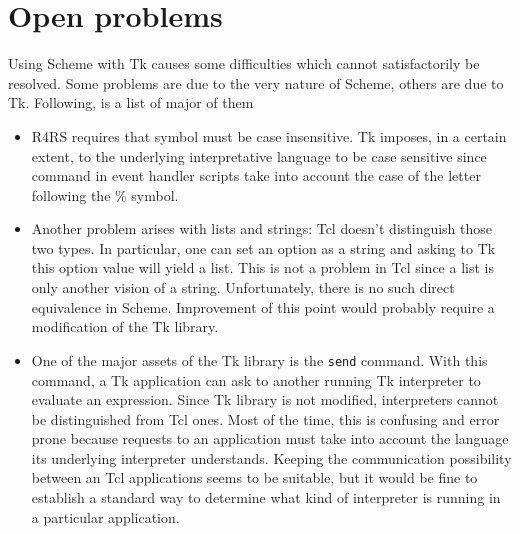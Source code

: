 \section{Open problems}
Using Scheme with Tk causes some difficulties which cannot satisfactorily be
resolved. Some problems are due to the very nature of Scheme, others are due to
Tk. Following, is a list of major of them 
\begin {itemize}
\item R4RS requires that symbol must be case insensitive. Tk
imposes, in a certain extent, to the underlying interpretative language to
be case sensitive since command in event handler scripts take into account
the case of the letter following the \% symbol. 

\item  Another problem arises with lists and strings: Tcl doesn't
distinguish those two types. In particular, one can set an option as a string
and asking to Tk this option value will yield a list. This is not a problem in
Tcl since a list is only another vision of a string. Unfortunately, there is no
such direct equivalence in Scheme. Improvement of this point would probably
require a modification of the Tk library.


\item One of the major assets of the Tk library is the {\tt send} command.
With this command, a Tk application can ask to another running Tk interpreter to
evaluate an expression. Since Tk library is not modified, \stk interpreters
cannot be distinguished from Tcl ones. Most of the time, this is confusing and
error prone because requests to an application must take into account the
language its underlying interpreter understands. 
Keeping the communication possibility between \stk an Tcl applications seems
to be suitable, but it would be fine to establish a standard way to
determine what kind of interpreter is running in a particular application.
\end {itemize}




